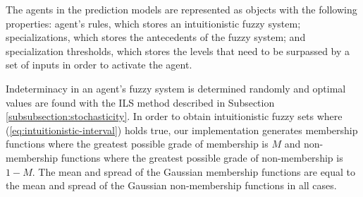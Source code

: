 \documentclass{ieeeaccess}
\begin{document}




The agents in the prediction models are represented as objects with the following properties: agent's rules, which stores an intuitionistic fuzzy system; specializations, which stores the antecedents of the fuzzy system; and specialization thresholds, which stores the levels that need to be surpassed by a set of inputs in order to activate the agent.

Indeterminacy in an agent's fuzzy system is determined randomly and optimal values are found with the ILS method described in Subsection \ref{subsubsection:stochasticity}. In order to obtain intuitionistic fuzzy sets where (\ref{eq:intuitionistic-interval}) holds true, our implementation generates membership functions where the greatest possible grade of membership is $M$ and non-membership functions where the greatest possible grade of non-membership is $1 - M$. The mean and spread of the Gaussian membership functions are equal to the mean and spread of the Gaussian non-membership functions in all cases.
\end{document}
